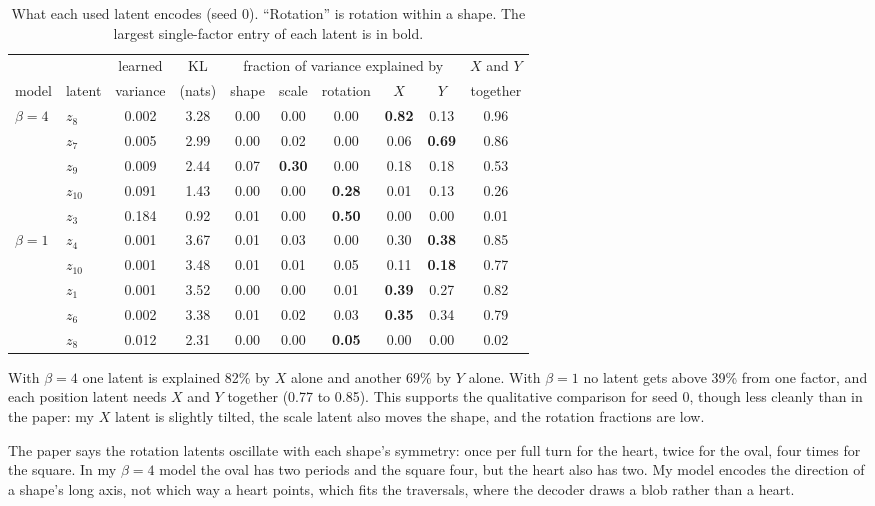 \begin{table}[H]\centering\small
\begin{tabular}{@{}l l cc ccccc c@{}}
\toprule
 & & learned & KL & \multicolumn{5}{c}{fraction of variance explained by} & $X$ and $Y$\\
\cmidrule(lr){5-9}
model & latent & variance & (nats) & shape & scale & rotation & $X$ & $Y$ & together\\
\midrule
$\beta=4$ & $z_8$ & 0.002 & 3.28 & 0.00 & 0.00 & 0.00 & \textbf{0.82} & 0.13 & 0.96\\
 & $z_7$ & 0.005 & 2.99 & 0.00 & 0.02 & 0.00 & 0.06 & \textbf{0.69} & 0.86\\
 & $z_9$ & 0.009 & 2.44 & 0.07 & \textbf{0.30} & 0.00 & 0.18 & 0.18 & 0.53\\
 & $z_{10}$ & 0.091 & 1.43 & 0.00 & 0.00 & \textbf{0.28} & 0.01 & 0.13 & 0.26\\
 & $z_3$ & 0.184 & 0.92 & 0.01 & 0.00 & \textbf{0.50} & 0.00 & 0.00 & 0.01\\
\addlinespace
$\beta=1$ & $z_4$ & 0.001 & 3.67 & 0.01 & 0.03 & 0.00 & 0.30 & \textbf{0.38} & 0.85\\
 & $z_{10}$ & 0.001 & 3.48 & 0.01 & 0.01 & 0.05 & 0.11 & \textbf{0.18} & 0.77\\
 & $z_1$ & 0.001 & 3.52 & 0.00 & 0.00 & 0.01 & \textbf{0.39} & 0.27 & 0.82\\
 & $z_6$ & 0.002 & 3.38 & 0.01 & 0.02 & 0.03 & \textbf{0.35} & 0.34 & 0.79\\
 & $z_8$ & 0.012 & 2.31 & 0.00 & 0.00 & \textbf{0.05} & 0.00 & 0.00 & 0.02\\
\bottomrule
\end{tabular}
\caption{What each used latent encodes (seed 0). ``Rotation'' is rotation within a shape. The largest single-factor entry of each latent is in bold.}
\label{tab:latents}
\end{table}

With $\beta=4$ one latent is explained 82\% by $X$ alone and another 69\% by $Y$ alone. With $\beta=1$ no latent gets above 39\% from one factor, and each position latent needs $X$ and $Y$ together (0.77 to 0.85). This supports the qualitative comparison for seed 0, though less cleanly than in the paper: my $X$ latent is slightly tilted, the scale latent also moves the shape, and the rotation fractions are low.

The paper says the rotation latents oscillate with each shape's symmetry: once per full turn for the heart, twice for the oval, four times for the square. In my $\beta=4$ model the oval has two periods and the square four, but the heart also has two. My model encodes the direction of a shape's long axis, not which way a heart points, which fits the traversals, where the decoder draws a blob rather than a heart.

